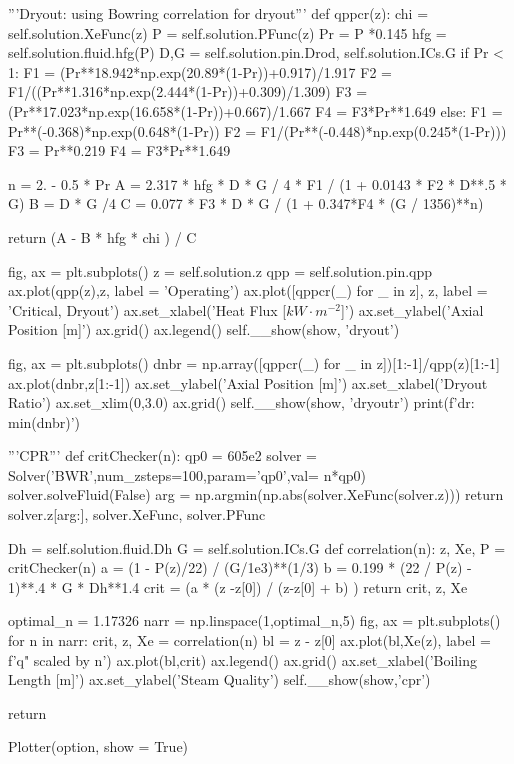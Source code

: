 \documentclass{article}
\begin{document}
\begin{python}
        '''Dryout: using Bowring correlation for dryout''' 
        def qppcr(z):
            chi = self.solution.XeFunc(z)
            P = self.solution.PFunc(z)
            Pr = P *0.145
            hfg = self.solution.fluid.hfg(P)
            D,G = self.solution.pin.Drod, self.solution.ICs.G
            if Pr < 1:
                F1 = (Pr**18.942*np.exp(20.89*(1-Pr))+0.917)/1.917
                F2 = F1/((Pr**1.316*np.exp(2.444*(1-Pr))+0.309)/1.309)
                F3 = (Pr**17.023*np.exp(16.658*(1-Pr))+0.667)/1.667
                F4 = F3*Pr**1.649
            else: 
                F1 = Pr**(-0.368)*np.exp(0.648*(1-Pr))
                F2 = F1/(Pr**(-0.448)*np.exp(0.245*(1-Pr)))
                F3 = Pr**0.219
                F4 = F3*Pr**1.649

            n = 2. - 0.5 * Pr
            A = 2.317 * hfg * D * G / 4 * F1 / (1 + 0.0143 * F2 * D**.5 * G)
            B = D * G /4
            C = 0.077 * F3 * D * G / (1 + 0.347*F4 * (G / 1356)**n)

            return (A - B * hfg * chi ) / C

        fig, ax = plt.subplots()
        z = self.solution.z
        qpp = self.solution.pin.qpp
        ax.plot(qpp(z),z, label = 'Operating')
        ax.plot([qppcr(_) for _ in z], z, label = 'Critical, Dryout')
        ax.set_xlabel('Heat Flux  [$kW \cdot m^{-2}$]')
        ax.set_ylabel('Axial Position  [m]')
        ax.grid()
        ax.legend()
        self.__show(show, 'dryout')

        fig, ax = plt.subplots()
        dnbr = np.array([qppcr(_) for _ in z])[1:-1]/qpp(z)[1:-1]
        ax.plot(dnbr,z[1:-1])
        ax.set_ylabel('Axial Position  [m]')
        ax.set_xlabel('Dryout Ratio')
        ax.set_xlim(0,3.0)
        ax.grid()
        self.__show(show, 'dryoutr')
        print(f'dr: {min(dnbr)}')


        '''CPR'''
        def critChecker(n):
            qp0 = 605e2
            solver = Solver('BWR',num_zsteps=100,param='qp0',val= n*qp0)
            solver.solveFluid(False)
            arg = np.argmin(np.abs(solver.XeFunc(solver.z)))
            return solver.z[arg:], solver.XeFunc, solver.PFunc
        
        Dh = self.solution.fluid.Dh
        G = self.solution.ICs.G
        def correlation(n):
            z, Xe, P = critChecker(n)
            a = (1 - P(z)/22) / (G/1e3)**(1/3)
            b = 0.199 * (22 / P(z) - 1)**.4 * G * Dh**1.4
            crit = (a * (z -z[0]) / (z-z[0] + b) )
            return crit, z, Xe
        
        optimal_n = 1.17326
        narr = np.linspace(1,optimal_n,5)
        fig, ax = plt.subplots()
        for n in narr:
            crit, z, Xe = correlation(n)
            bl = z - z[0]
            ax.plot(bl,Xe(z), label = f'q" scaled by {n}')
        ax.plot(bl,crit)
        ax.legend()
        ax.grid()
        ax.set_xlabel('Boiling Length  [m]')
        ax.set_ylabel('Steam Quality')
        self.__show(show,'cpr')
        
        return

        Plotter(option, show = True)

\end{python}
\end{document}
